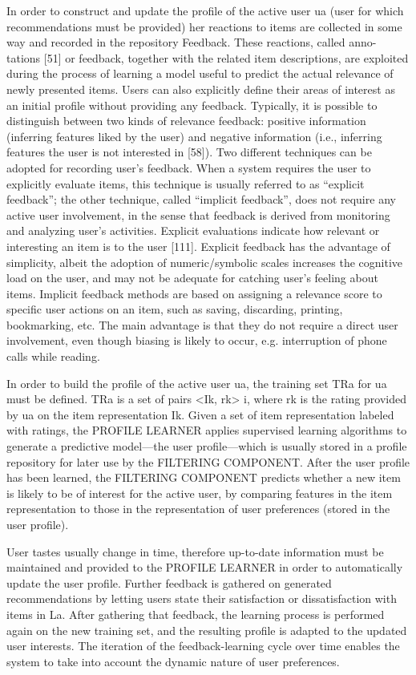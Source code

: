 In order to construct and update the profile of the active user ua (user for which recommendations must be provided) her reactions to items are collected in some way and recorded in the repository Feedback. These reactions, called anno- tations [51] or feedback, together with the related item descriptions, are exploited during the process of learning a model useful to predict the actual relevance of newly presented items. Users can also explicitly define their areas of interest as an initial profile without providing any feedback. Typically, it is possible to distinguish between two kinds of relevance feedback: positive information (inferring features liked by the user) and negative information (i.e., inferring features the user is not interested in [58]). Two different techniques can be adopted for recording user’s feedback. When a system requires the user to explicitly evaluate items, this technique is usually referred to as “explicit feedback”; the other technique, called “implicit feedback”, does not require any active user involvement, in the sense that feedback is derived from monitoring and analyzing user’s activities. Explicit evaluations indicate how relevant or interesting an item is to the user [111]. Explicit feedback has the advantage of simplicity, albeit the adoption of numeric/symbolic scales increases the cognitive load on the user, and may not be adequate for catching user’s feeling about items. Implicit feedback methods are based on assigning a relevance score to specific user actions on an item, such as saving, discarding, printing, bookmarking, etc. The main advantage is that they do not require a direct user involvement, even though biasing is likely to occur, e.g. interruption of phone calls while reading.

In order to build the profile of the active user ua, the training set TRa for ua must be defined. TRa is a set of pairs <Ik, rk> i, where rk is the rating provided by ua on the item representation Ik. Given a set of item representation labeled with ratings, the PROFILE LEARNER applies supervised learning algorithms to generate a predictive model—the user profile—which is usually stored in a profile repository for later use by the FILTERING COMPONENT. After the user profile has been learned, the FILTERING COMPONENT predicts whether a new item is likely to be of interest for the active user, by comparing features in the item representation to those in the representation of user preferences (stored in the user profile).

User tastes usually change in time, therefore up-to-date information must be maintained and provided to the PROFILE LEARNER in order to automatically update the user profile. Further feedback is gathered on generated recommendations by letting users state their satisfaction or dissatisfaction with items in La. After gathering that feedback, the learning process is performed again on the new training set, and the resulting profile is adapted to the updated user interests. The iteration of the feedback-learning cycle over time enables the system to take into account the dynamic nature of user preferences.

